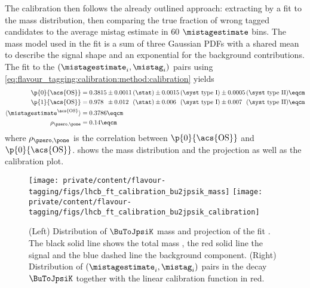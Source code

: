 The calibration then follows the already outlined approach: extracting \sweights
by a fit to the \Bu mass distribution, then comparing the true fraction of wrong
tagged candidates to the average mistag estimate in $\num{60}$ $\mistagestimate$
bins. The mass model used in the fit is a sum of three Gaussian \acp{PDF} with a
shared mean to describe the signal shape and an exponential \PDF for the
background contributions. The fit to the $(\mistagestimate_i,\mistag_i)$ pairs
using \cref{eq:flavour_tagging:calibration:method:calibration} yields
%
\begin{equation}\label{eq:flavour_tagging:calibration:os:parameters}
  \begin{split}
    \p{0}{\text{\acs{OS}}} &= 0.3815 \pm 0.0011 \text{\,(\stat)} 
                               \pm 0.0015 \text{\,(\syst type I)}  
                               \pm 0.0005 \text{\,(\syst type II)} \eqcm\\ %
    \p{1}{\text{\acs{OS}}} &= 0.978\phantom{0} \pm 0.012\phantom{0} \text{\,(\stat)} 
                                         \pm 0.006\phantom{0}  \text{\,(\syst type I)} 
                                         \pm 0.007\phantom{0}  \text{\,(\syst type II)} \eqcm\\ %
    \langle\mistagestimate^{\text{\acs{OS}}}\rangle &= 0.3786 \eqcm \\
    \rho_{\pzero,\pone} &= 0.14 \eqcm
  \end{split}
\end{equation}
%
where $\rho_{\pzero,\pone}$ is the correlation between $\p{0}{\text{\acs{OS}}}$ and
$\p{0}{\text{\acs{OS}}}$.  
shows the mass distribution and the \PDF projection as well as the calibration
plot.
%
\begin{figure}
  \centering
  \texttt{[image: private/content/flavour-tagging/figs/lhcb\_ft\_calibration\_bu2jpsik\_mass]}
  \texttt{[image: private/content/flavour-tagging/figs/lhcb\_ft\_calibration\_bu2jpsik\_calibration]}
  \caption{(Left) Distribution of $\BuToJpsiK$ mass and projection of the fit \PDF.
  The black solid line shows the total mass \PDF, the red solid line the signal
  and the blue dashed line the background component. (Right) Distribution of
  $(\mistagestimate_i,\mistag_i)$ pairs in the decay $\BuToJpsiK$ together with
  the linear calibration function in red. \cite{FT:RunI}}
  \label{fig:flavour_tagging:calibration:os:mass_and_calibration}
\end{figure}
